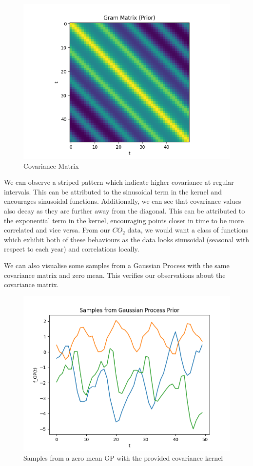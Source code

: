 \documentclass[12pt]{article}
\begin{document}
\begin{figure}[h]
\centering
\includegraphics[scale=0.5]{outputs/q2/c-gram-matrix}
\caption{Covariance Matrix}
\label{fig:c-gram-matrix}
\end{figure}

We can observe a striped pattern which indicate higher covariance at regular intervals.
This can be attributed to the sinusoidal term in the kernel and encourages sinusoidal functions.
Additionally, we can see that covariance values also decay as they are further away from the diagonal.
This can be attributed to the exponential term in the kernel, encouraging points closer in time to be more correlated and vice versa.
From our $CO_2$ data, we would want a class of functions which exhibit both of these behaviours as the data looks sinusoidal (seasonal with respect to each year) and correlations locally.

We can also visualise some samples from a Gaussian Process with the same covariance matrix and zero mean.
This verifies our observations about the covariance matrix.

\begin{figure}[h]
\centering
\includegraphics[scale=0.5]{outputs/q2/c-samples}
\caption{Samples from a zero mean GP with the provided covariance kernel}
\label{fig:c-samples}
\end{figure}
\end{document}
